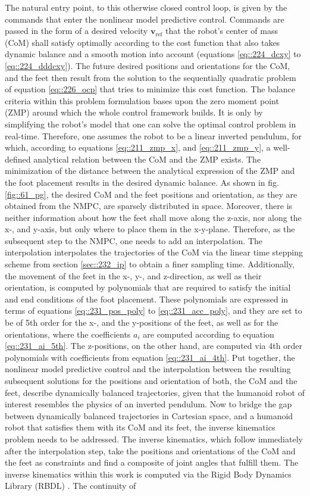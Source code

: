 The natural entry point, to this otherwise closed control loop, is given by the commands that enter the nonlinear model predictive control. Commands are passed in the form of a desired velocity $\mathbf{v}_\text{ref}$ that the robot's center of mass (CoM) shall satisfy optimally according to the cost function that also takes dynamic balance and a smooth motion into account (equations \ref{eq::224_dcxy} to \ref{eq::224_dddcxy}). The future desired positions and orientations for the CoM, and the feet then result from the solution to the sequentially quadratic problem of equation \ref{eq::226_ocp} that tries to minimize this cost function. The balance criteria within this problem formulation bases upon the zero moment point (ZMP) around which the whole control framework builds. It is only by simplifying the robot's model that one can solve the optimal control problem in real-time. Therefore, one assumes the robot to be a linear inverted pendulum, for which, according to equations \ref{eq::211_zmp_x}, and \ref{eq::211_zmp_y}, a well-defined analytical relation between the CoM and the ZMP exists. The minimization of the distance between the analytical expression of the ZMP and the foot placement results in the desired dynamic balance. As shown in fig. \ref{fig::61_pg}, the desired CoM and the feet positions and orientation, as they are obtained from the NMPC, are sparsely distributed in space. Moreover, there is neither information about how the feet shall move along the z-axis, nor along the x-, and y-axis, but only where to place them in the x-y-plane. Therefore, as the subsequent step to the NMPC, one needs to add an interpolation. The interpolation interpolates the trajectories of the CoM via the linear time stepping scheme from section \ref{sec::232_ip} to obtain a finer sampling time. Additionally, the movement of the feet in the x-, y-, and z-direction, as well as their orientation, is computed by polynomials that are required to satisfy the initial and end conditions of the foot placement. These polynomials are expressed in terms of equations \ref{eq::231_pos_poly} to \ref{eq::231_acc_poly}, and they are set to be of 5th order for the x-, and the y-positions of the feet, as well as for the orientations, where the coefficients $a_i$ are computed according to equation \ref{eq::231_ai_5th}. The z-positions, on the other hand, are computed via 4th order polynomials with coefficients from equation \ref{eq::231_ai_4th}. Put together, the nonlinear model predictive control and the interpolation between the resulting subsequent solutions for the positions and orientation of both, the CoM and the feet, describe dynamically balanced trajectories, given that the humanoid robot of interest resembles the physics of an inverted pendulum. Now to bridge the gap between dynamically balanced trajectories in Cartesian space, and a humanoid robot that satisfies them with its CoM and its feet, the inverse kinematics problem needs to be addressed. The inverse kinematics, which follow immediately after the interpolation step, take the positions and orientations of the CoM and the feet as constraints and find a composite of joint angles that fulfill them. The inverse kinematics within this work is computed via the Rigid Body Dynamics Library (RBDL) \cite{felis2017rbdl}. The continuity of 